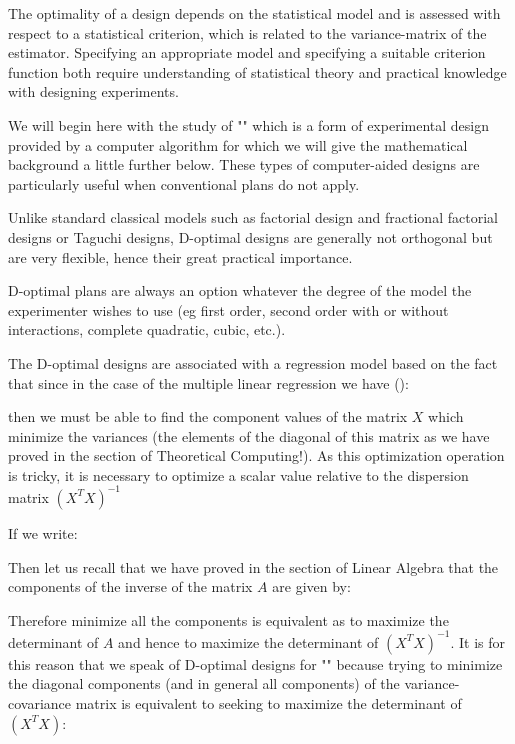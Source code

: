 	The optimality of a design depends on the statistical model and is assessed with respect to a statistical criterion, which is related to the variance-matrix of the estimator. Specifying an appropriate model and specifying a suitable criterion function both require understanding of statistical theory and practical knowledge with designing experiments.

	We will begin here with the study of "" which is a form of experimental design provided by a computer algorithm for which we will give the mathematical background a little further below. These types of computer-aided designs are particularly useful when conventional plans do not apply.

	Unlike standard classical models such as factorial design and fractional factorial designs or Taguchi designs, D-optimal designs are generally not orthogonal but are very flexible, hence their great practical importance.

	D-optimal plans are always an option whatever the degree of the model the experimenter wishes to use (eg first order, second order with or without interactions, complete quadratic, cubic, etc.).

	The D-optimal designs are associated with a regression model based on the fact that since in the case of the multiple linear regression we have ():
	
 	then we must be able to find the component values of the matrix $X$ which minimize the variances (the elements of the diagonal of this matrix as we have proved in the section of Theoretical Computing!). As this optimization operation is tricky, it is necessary to optimize a scalar value relative to the dispersion matrix $(X^TX)^{-1}$

	If we write:
	
	Then let us recall that we have proved in the section of Linear Algebra that the components of the inverse of the matrix $A$ are given by:
	
	Therefore minimize all the components is equivalent as to maximize the determinant of $A$ and hence to maximize the determinant of $(X^TX)^{-1}$. It is for this reason that we speak of D-optimal designs for "" because trying to minimize the diagonal components (and in general all components) of the variance-covariance matrix is equivalent to seeking to maximize the determinant of $(X^TX)$:
	
